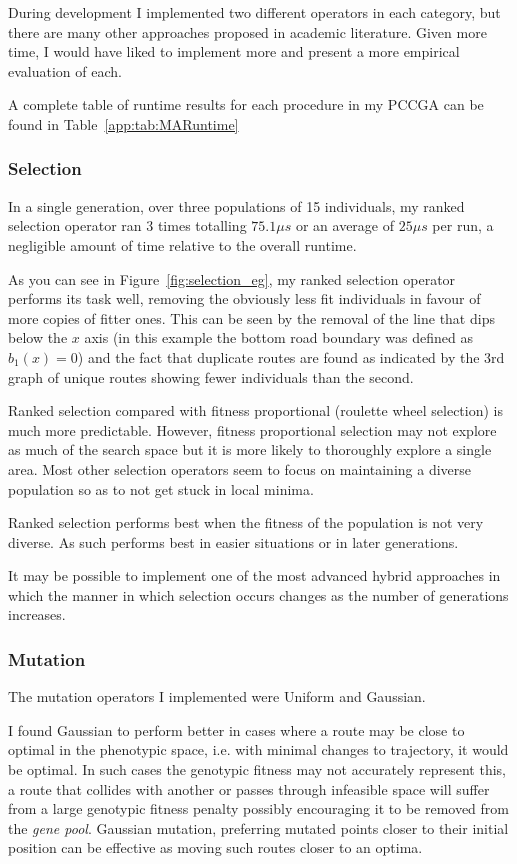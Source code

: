 During development I implemented two different operators in each category, but there are many other approaches proposed in academic literature. Given more time, I would have liked to implement more and present a more empirical evaluation of each.

A complete table of runtime results for each procedure in my PCCGA can be found in Table~\ref{app:tab:MARuntime}

\subsubsection{Selection}

In a single generation, over three populations of 15 individuals, my ranked selection operator ran 3 times totalling $75.1\mu s$ or an average of $25 \mu s$ per run, a negligible amount of time relative to the overall runtime.

As you can see in Figure~\ref{fig:selection_eg}, my ranked selection operator performs its task well, removing the obviously less fit individuals in favour of more copies of  fitter ones. This can be seen by the removal of the line that dips below the $x$ axis (in this example the bottom road boundary was defined as $b_{1}(x) = 0 $) and the fact that duplicate routes are found as indicated by the 3rd graph of unique routes showing fewer individuals than the second.

Ranked selection compared with fitness proportional (roulette wheel selection) is much more predictable. However, fitness proportional selection may not explore as much of the search space but it is more likely to thoroughly explore a single area. Most other selection operators seem to focus on maintaining a diverse population so as to not get stuck in local minima.

Ranked selection performs best when the fitness of the population is not very diverse. As such performs best in easier situations or in later generations.

It may be possible to implement one of the most advanced hybrid approaches in which the manner in which selection occurs changes as the number of generations increases.

\subsubsection{Mutation}

The mutation operators I implemented were Uniform and Gaussian.

I found Gaussian to perform better in cases where a route may be close to optimal in the phenotypic space, i.e. with minimal changes to trajectory, it would be optimal. In such cases the genotypic fitness may not accurately represent this, a route that collides with another or passes through infeasible space will suffer from a large genotypic fitness penalty possibly encouraging it to be removed from the \textit{gene pool}. Gaussian mutation, preferring mutated points closer to their initial position can be effective as moving such routes closer to an optima.

